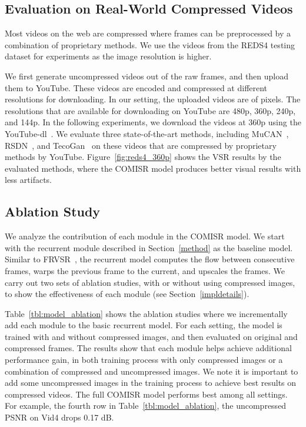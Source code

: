 \subsection{Evaluation on Real-World Compressed Videos}
\label{youtuberesults}
Most videos on the web are compressed where
frames can be preprocessed by a combination of proprietary   methods.
We use the videos from the REDS4 testing dataset for experiments as the image resolution is higher.

We first generate uncompressed videos out of the raw frames, and then upload them to YouTube.
These videos are encoded and compressed at different resolutions for downloading.
In our setting, the uploaded videos are of  pixels.
The resolutions that are available for downloading on YouTube are 480p, 360p, 240p, and 144p.
In the following experiments, we download the videos at 360p using the YouTube-dl~\cite{youtube-dl}.
We evaluate three state-of-the-art methods, including MuCAN~\cite{mucan}, RSDN~\cite{rsdn}, and TecoGan~\cite{tecogan2020} on these videos that are compressed by proprietary methods by YouTube. 
Figure~\ref{fig:reds4_360p} shows the VSR results by the evaluated methods, where the COMISR model produces better visual results with less artifacts.



\subsection{Ablation Study}
\label{modelablation}
We analyze the contribution of each module in the COMISR model.
We start with the recurrent module described in Section~\ref{method} as the baseline model. 
Similar to FRVSR~\cite{frvsr}, the recurrent model computes the flow between consecutive frames, warps the previous frame to the current, and upscales the frames. 
We carry out two sets of ablation studies, with or without using compressed images, to show the effectiveness of each module (see Section~\ref{impldetails}).

Table~\ref{tbl:model_ablation} shows the ablation studies where we incrementally add each module to the basic recurrent model.
For each setting, the model is trained with and without compressed images, and then evaluated on original and compressed frames.
The results show that each module helps achieve additional performance gain, in both training process with only compressed images or a combination of compressed and uncompressed images. 
We note it is important to add some uncompressed images in the training process to achieve best results on compressed videos. 
The full COMISR model performs best among all settings. 
For example, the fourth row in Table~\ref{tbl:model_ablation}, the uncompressed PSNR on Vid4 drops 0.17 dB.



